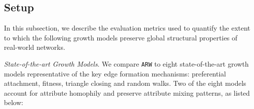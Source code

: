 \subsection{Setup}
\label{sub:Experimental Setup}

In this subsection, we describe the evaluation metrics used to quantify the extent to
which the following growth models preserve global structural properties of real-world networks.

\textit{State-of-the-art Growth Models}. We compare \texttt{ARW} to eight state-of-the-art
growth models representative of the key edge formation
mechanisms: preferential attachment, fitness, triangle closing and random walks.
Two of the eight models account for attribute homophily and preserve attribute mixing patterns,
as listed below:
